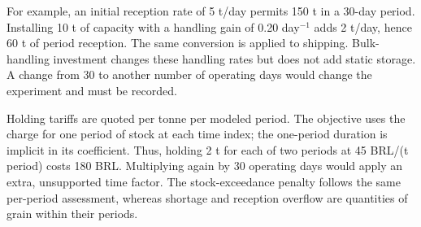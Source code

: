 \documentclass[
  english,
  11pt,
  a4paper,
]{article}
\begin{document}
For example, an initial reception rate of 5 t/day permits 150 t in a
30-day period. Installing 10 t of capacity with a handling gain of 0.20
day\(^{-1}\) adds 2 t/day, hence 60 t of period reception. The same
conversion is applied to shipping. Bulk-handling investment changes
these handling rates but does not add static storage. A change from 30
to another number of operating days would change the experiment and must
be recorded.

Holding tariffs are quoted per tonne per modeled period. The objective
uses the charge for one period of stock at each time index; the
one-period duration is implicit in its coefficient. Thus, holding 2 t
for each of two periods at 45 BRL/(t period) costs 180 BRL. Multiplying
again by 30 operating days would apply an extra, unsupported time
factor. The stock-exceedance penalty follows the same per-period
assessment, whereas shortage and reception overflow are quantities of
grain within their periods.
\end{document}
